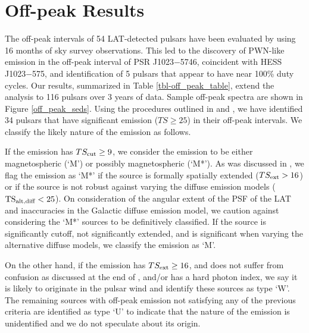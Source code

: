 \section{Off-peak Results}

The off-peak intervals of 54 LAT-detected pulsars have
been evaluated by \citet{ackermann_2011a_fermi-lat-search} using 16 months of sky survey observations.  
This led to the discovery of PWN-like emission
in the off-peak interval of PSR J1023$-$5746, coincident with HESS
J1023$-$575, and identification of 5 pulsars that appear to have near 100\%
duty cycles.  Our results, summarized in Table \ref{tbl-off_peak_table},
extend the analysis to 116 pulsars over 3 years of data.  
Sample off-peak spectra are shown in Figure \ref{off_peak_seds}.
Using the procedures outlined in 
and , we have identified 34 pulsars that
have significant emission ($TS\geq25$) in their off-peak intervals.
We classify the likely nature of the emission as follows.

If the emission has $TS_{\rm cut}\geq9$, we consider the emission to be
either magnetospheric (`M') or possibly magnetospheric (`M*').
As was discussed in , 
we flag the emission as `M*' if the source is formally spatially extended
($TS_{\rm ext}>16$) or if the source is not robust against varying
the diffuse emission models ($\mathrm{TS}_{\text{alt,diff}}<25$). 
On consideration of the angular extent of the PSF of the LAT and inaccuracies in the Galactic diffuse
emission model, we caution against considering the `M*' sources to be definitively classified.
If the source is significantly cutoff, not
significantly extended, and is significant when varying the alternative diffuse models,
we classify the emission as `M'.


On the other hand, if the
emission has $TS_{\rm ext}\geq16$, and does not suffer from confusion as
discussed at the end of , and/or has a hard
photon index, we say it is likely
to originate in the pulsar wind and identify these sources as type `W'.
The remaining sources with off-peak emission not satisfying any of the
previous criteria are identified as type `U' to indicate that the nature
of the emission is unidentified and we do not speculate about its origin.


